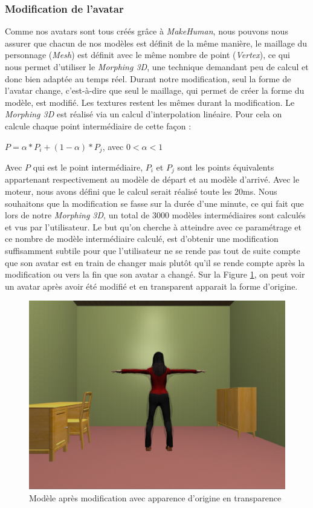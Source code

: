 \subsubsection{Modification de l'avatar}
Comme nos avatars sont tous créés grâce à \emph{MakeHuman}, nous pouvons nous assurer que chacun de nos modèles est définit de la même manière, le maillage du personnage (\emph{Mesh}) est définit avec le même nombre de point (\emph{Vertex}), ce qui nous permet d'utiliser le \emph{Morphing 3D}, une technique demandant peu de calcul et donc bien adaptée au temps réel. Durant notre modification, seul la forme de l'avatar change, c'est-à-dire que seul le maillage, qui permet de créer la forme du modèle, est modifié. Les textures restent les mêmes durant la modification. Le \emph{Morphing 3D} est réalisé via un calcul d'interpolation linéaire. Pour cela on calcule chaque point intermédiaire de cette façon :
\begin{center}
$P = \alpha*P_i + (1-\alpha)*P_j$, avec $0<\alpha<1$
\end{center}
Avec $P$ qui est le point intermédiaire, $P_i$ et $P_j$ sont les points équivalents appartenant respectivement au modèle de départ et au modèle d'arrivé. Avec le moteur, nous avons défini que le calcul serait réalisé toute les 20ms. Nous souhaitons que la modification se fasse sur la durée d'une minute, ce qui fait que lors de notre \emph{Morphing 3D}, un total de 3000 modèles intermédiaires sont calculés et vus par l'utilisateur. Le but qu'on cherche à atteindre avec ce paramétrage et ce nombre de modèle intermédiaire calculé, est d'obtenir une modification suffisamment subtile pour que l'utilisateur ne se rende pas tout de suite compte que son avatar est en train de changer mais plutôt qu'il se rende compte après la modification ou vers la fin que son avatar a changé. Sur la Figure \ref{morphingGhost}, on peut voir un avatar après avoir été modifié et en transparent apparait la forme d'origine.

\begin{figure}[!h]
   	\centerline{\includegraphics[scale=0.5]{images/morphingGhost2}}
   	\caption{\label{morphingGhost} Modèle après modification avec apparence d'origine en transparence }
\end{figure}
